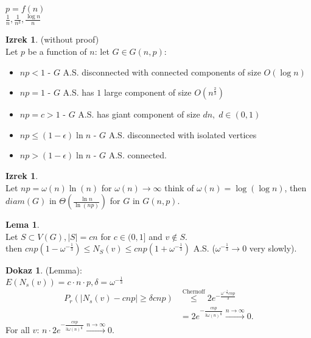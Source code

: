 \documentclass[a4paper, 12pt]{book}
\theoremstyle{definition}
\newtheorem{lemma}[counter]{Lema}
\newtheorem{theorem}[counter]{Izrek}
\newtheorem{pro}[counter]{Dokaz}
\theoremstyle{remark}
\begin{document}
$p = f(n)$ \\
$\frac{1}{n}, \frac{1}{n^3}, \frac{\log n}{n}$
\begin{theorem} (without proof) \\
  Let $p$ be a function of $n$: let $G \in G(n,p)$:
  \begin{itemize}
    \item $np < 1$ - $G$ A.S. disconnected with connected components of size $O(\log n)$
    \item $np = 1$ - $G$ A.S. has $1$ large component of size $O\left(n^{\frac{2}{3}}\right)$
    \item $np = c > 1$ - $G$ A.S. has giant component of size $dn, \; d \in (0,1)$
    \item $np \leq (1-\epsilon) \ln n$ - $G$ A.S. disconnected with isolated vertices
    \item $np > (1-\epsilon) \ln n$ - $G$ A.S. connected.
  \end{itemize}
\end{theorem}
\begin{theorem} \text{} \\
  Let $np = \omega(n) \ln(n)$ for $\omega(n) \to \infty$  think of $\omega(n) = \log (\log n)$,
  then $diam(G)$ in $\Theta\left(\frac{\ln n}{\ln (np)}\right)$ for $G$ in $G(n,p)$.
\end{theorem}
\begin{lemma} \text{} \\
  Let $S \subset V(G), |S| = cn$ for $c \in (0,1]$ and $v \notin S$. \\
  then $cnp(1-\omega^{-\frac{1}{3}}) \leq N_S(v) \leq cnp(1+\omega^{-\frac{1}{3}})$ A.S.
  ($\omega^{-\frac{1}{3}} \to 0$ very slowly).
\end{lemma}
\begin{pro}(Lemma): \\
  $E(N_s(v)) = c \cdot n \cdot p, \delta = \omega^{-\frac{1}{3}}$ \\
  \begin{align*}
    P_r(|N_s(v) - cnp| \geq \delta cnp) &\stackrel{\text{Chernoff}}{\leq} 2 e^{-\frac{\omega^{-\frac{2}{3}} cnp}{3}} \\
    &= 2 e^{-\frac{cnp}{3 \omega(n)^{\frac{2}{3}}}} \stackrel{n \to \infty}{\to} 0.
  \end{align*}
  For all $v$: $n \cdot 2 e^{-\frac{cnp}{3 \omega(n)^{\frac{2}{3}}}} \stackrel{n \to \infty}{\to} 0$.
\end{pro}
\end{document}

